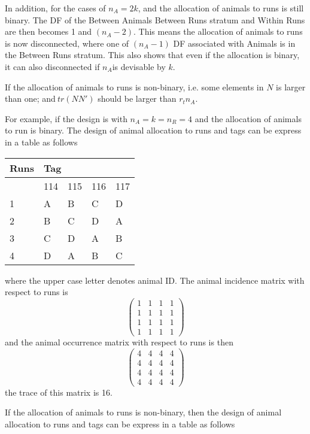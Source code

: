 \noindent In addition, for the cases of $n_A=2k$, and the allocation of animals to runs is still binary. The DF of the Between Animals Between Runs stratum and Within Runs are then becomes 1 and $\left(n_A-2\right)$. This means the allocation of animals to runs is now disconnected, where one of $(n_A-1)$ DF associated with Animals is in the Between Runs stratum. This also shows that even if the allocation is binary, it can also disconnected if $n_A$is devisable by $k$.

\noindent 

\noindent If the allocation of animals to runs is non-binary, i.e. some elements in $N$ is larger than one; and$\ tr(NN')$ should be larger than $r_tn_A$.  

\noindent \eject 

\noindent For example, if the design is with $n_A=k=n_R=4$ and the allocation of animals to run is binary. The design of animal allocation to runs and tags can be express in a table as follows

\begin{tabular}{|p{0.3in}|p{0.3in}|p{0.3in}|p{0.3in}|p{0.3in}|} \hline 
Runs & \multicolumn{4}{|p{1.3in}|}{Tag} \\ \hline 
 & 114 & 115 & 116 & 117 \\ \hline 
1 & A & B & C & D \\ \hline 
2 & B & C & D & A \\ \hline 
3 & C & D & A & B \\ \hline 
4 & D & A & B & C \\ \hline 
\end{tabular}

where the upper case letter denotes animal ID. The animal incidence matrix with respect to runs is
\[\left( \begin{array}{cccc}
1 & 1 & 1 & 1 \\ 
1 & 1 & 1 & 1 \\ 
1 & 1 & 1 & 1 \\ 
1 & 1 & 1 & 1 \end{array}
\right)\] 
and the animal occurrence matrix with respect to runs is then 
\[\left( \begin{array}{cccc}
4 & 4 & 4 & 4 \\ 
4 & 4 & 4 & 4 \\ 
4 & 4 & 4 & 4 \\ 
4 & 4 & 4 & 4 \end{array}
\right)\] 
the trace of this matrix is 16.

\noindent If the allocation of animals to runs is non-binary, then the design of animal allocation to runs and tags can be express in a table as follows


